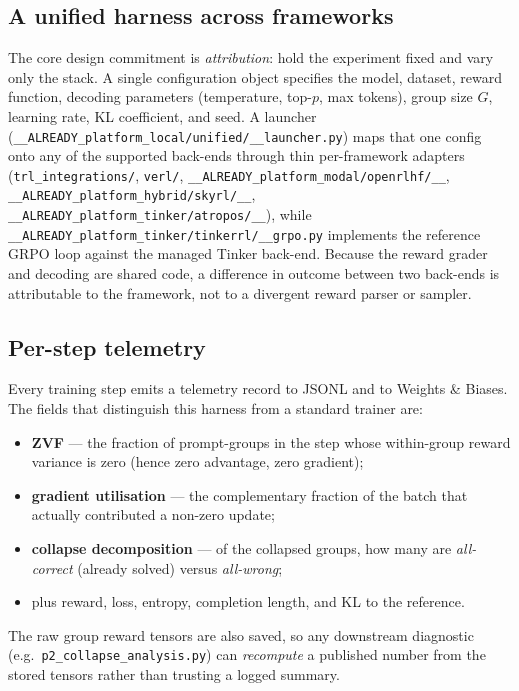 \documentclass[12pt,a4paper]{report}
\begin{document}
\subsection{A unified harness across frameworks}

The core design commitment is \emph{attribution}: hold the experiment fixed and
vary only the stack. A single configuration object specifies the model, dataset,
reward function, decoding parameters (temperature, top-$p$, max tokens), group
size $G$, learning rate, KL coefficient, and seed. A launcher
(\texttt{__ALREADY_platform_local/unified/__launcher.py}) maps that one config onto any of the supported
back-ends through thin per-framework adapters
(\texttt{trl\_integrations/}, \texttt{verl/}, \texttt{__ALREADY_platform_modal/openrlhf/__},
\texttt{__ALREADY_platform_hybrid/skyrl/__}, \texttt{__ALREADY_platform_tinker/atropos/__}), while \texttt{__ALREADY_platform_tinker/tinkerrl/__grpo.py} implements
the reference GRPO loop against the managed Tinker back-end. Because the reward
grader and decoding are shared code, a difference in outcome between two
back-ends is attributable to the framework, not to a divergent reward parser or
sampler.

\subsection{Per-step telemetry}
Every training step emits a telemetry record to JSONL and to Weights \& Biases.
The fields that distinguish this harness from a standard trainer are:
\begin{itemize}[leftmargin=1.4em,itemsep=1pt]
  \item \textbf{ZVF} --- the fraction of prompt-groups in the step whose
  within-group reward variance is zero (hence zero advantage, zero gradient);
  \item \textbf{gradient utilisation} --- the complementary fraction of the batch
  that actually contributed a non-zero update;
  \item \textbf{collapse decomposition} --- of the collapsed groups, how many are
  \emph{all-correct} (already solved) versus \emph{all-wrong};
  \item plus reward, loss, entropy, completion length, and KL to the reference.
\end{itemize}
The raw group reward tensors are also saved, so any downstream diagnostic
(e.g.\ \texttt{p2\_collapse\_analysis.py}) can \emph{recompute} a published number
from the stored tensors rather than trusting a logged summary.
\end{document}
